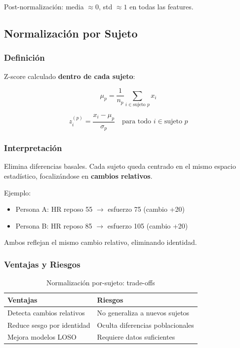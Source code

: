\documentclass[11pt,twoside,a4paper]{article}
\begin{document}
Post-normalización: media $\approx 0$, std $\approx 1$ en todas las features.

\subsection{Normalización por Sujeto}

\subsubsection{Definición}

Z-score calculado \textbf{dentro de cada sujeto}:

\begin{equation}
\mu_p = \frac{1}{n_p} \sum_{i \in \text{sujeto } p} x_i
\end{equation}

\begin{equation}
z_i^{(p)} = \frac{x_i - \mu_p}{\sigma_p} \quad \text{para todo } i \in \text{sujeto } p
\end{equation}

\subsubsection{Interpretación}

Elimina diferencias basales. Cada sujeto queda centrado en el mismo espacio estadístico, focalizándose en \textbf{cambios relativos}.

Ejemplo:
\begin{itemize}
    \item Persona A: HR reposo 55 $\to$ esfuerzo 75 (cambio +20)
    \item Persona B: HR reposo 85 $\to$ esfuerzo 105 (cambio +20)
\end{itemize}

Ambos reflejan el mismo cambio relativo, eliminando identidad.

\subsubsection{Ventajas y Riesgos}

\begin{table}[H]
\centering
\caption{Normalización por-sujeto: trade-offs}
\label{tab:norm_subject_trade}
\begin{tabular}{|l|l|}
\hline
\textbf{Ventajas} & \textbf{Riesgos} \\
\hline
Detecta cambios relativos & No generaliza a nuevos sujetos \\
\hline
Reduce sesgo por identidad & Oculta diferencias poblacionales \\
\hline
Mejora modelos LOSO & Requiere datos suficientes \\
\hline
\end{tabular}
\end{table}
\end{document}
